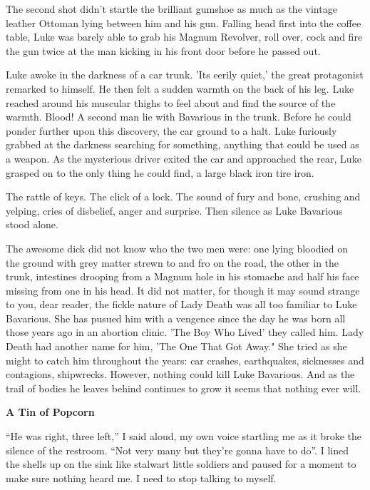 The second shot didn't startle the brilliant gumshoe as much as the
vintage leather Ottoman lying between him and his gun. Falling head
first into the coffee table, Luke was barely able to grab his
Magnum Revolver, roll over, cock and fire the gun twice at the man
kicking in his front door before he passed out.



Luke awoke in the darkness of a car trunk. 'Its eerily quiet,' the
great protagonist remarked to himself. He then felt a sudden warmth
on the back of his leg. Luke reached around his muscular thighs to
feel about and find the source of the warmth. Blood! A second man
lie with Bavarious in the trunk. Before he could ponder further
upon this discovery, the car ground to a halt. Luke furiously
grabbed at the darkness searching for something, anything that
could be used as a weapon. As the mysterious driver exited the car
and approached the rear, Luke grasped on to the only thing he could
find, a large black iron tire iron.



The rattle of keys. The click of a lock. The sound of fury and
bone, crushing and yelping, cries of disbelief, anger and surprise.
Then silence as Luke Bavarious stood alone.



The awesome dick did not know who the two men were: one lying
bloodied on the ground with grey matter strewn to and fro on the
road, the other in the trunk, intestines drooping from a Magnum
hole in his stomache and half his face missing from one in his
head. It did not matter, for though it may sound strange to you,
dear reader, the fickle nature of Lady Death was all too familiar
to Luke Bavarious. She has pusued him with a vengence since the day
he was born all those years ago in an abortion clinic. 'The Boy Who
Lived' they called him. Lady Death had another name for him, 'The
One That Got Away." She tried as she might to catch him throughout
the years: car crashes, earthquakes, sicknesses and contagions,
shipwrecks. However, nothing could kill Luke Bavarious. And as the
trail of bodies he leaves behind continues to grow it seems that
nothing ever will. 
 





{\bf A Tin of Popcorn}



``He was right, three left,'' I said aloud, my own voice startling me
as it broke the silence of the restroom. ``Not very many but they're
gonna have to do''. I lined the shells up on the sink like stalwart
little soldiers and paused for a moment to make sure nothing heard
me. I need to stop talking to myself.



